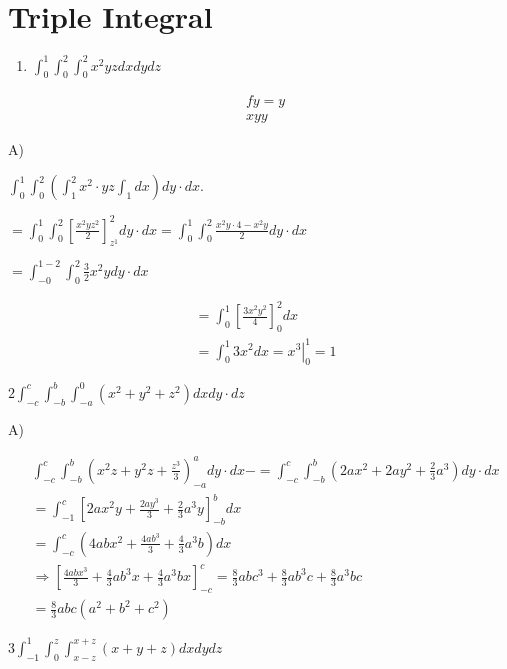 \documentclass[12pt, a4paper]{article}
\begin{document}
\section*{Triple Integral}
\begin{enumerate}
  \item $\int_{0}^{1} \int_{0}^{2} \int_{0}^{2} x^{2} y z d x d y d z$
\end{enumerate}

$$
\begin{aligned}
& f y=y \\
& x y y
\end{aligned}
$$

A)

$\int_{0}^{1} \int_{0}^{2}\left(\int_{1}^{2} x^{2} \cdot y z \int_{1} d x\right) d y \cdot d x$.

$=\int_{0}^{1} \int_{0}^{2}\left[\frac{x^{2} y z^{2}}{2}\right]_{z^{1}}^{2} d y \cdot d x=\int_{0}^{1} \int_{0}^{2} \frac{x^{2} y \cdot 4-x^{2} y}{2} d y \cdot d x$

$=\int_{-0}^{1-2} \int_{0}^{2} \frac{3}{2} x^{2} y d y \cdot d x$

$$
\begin{aligned}
& =\int_{0}^{1}\left[\frac{3 x^{2} y^{2}}{4}\right]_{0}^{2} d x \\
& =\int_{0}^{1} 3 x^{2} d x=\left.x^{3}\right|_{0} ^{1}=1
\end{aligned}
$$

$2 \int_{-c}^{c} \int_{-b}^{b} \int_{-a}^{0}\left(x^{2}+y^{2}+z^{2}\right) d x d y \cdot d z$

A)

$$
\begin{aligned}
& \int_{-c}^{c} \int_{-b}^{b}\left(x^{2} z+y^{2} z+\frac{z^{3}}{3}\right)_{-a}^{a} d y \cdot d x-=\int_{-c}^{c} \int_{-b}^{b}\left(2 a x^{2}+2 a y^{2}+\frac{2}{3} a^{3}\right) d y \cdot d x \\
&=\int_{-1}^{c}\left[2 a x^{2} y+\frac{2 a y^{3}}{3}+\frac{2}{3} a^{3} y\right]_{-b}^{b} d x \\
&=\int_{-c}^{c}\left(4 a b x^{2}+\frac{4 a b^{3}}{3}+\frac{4}{3} a^{3} b\right) d x \\
& \Rightarrow\left[\frac{4 a b x^{3}}{3}+\frac{4}{3} a b^{3} x+\frac{4}{3} a^{3} b x\right]_{-c}^{c}=\frac{8}{3} a b c^{3}+\frac{8}{3} a b^{3} c+\frac{8}{3} a^{3} b c \\
&=\frac{8}{3} a b c\left(a^{2}+b^{2}+c^{2}\right)
\end{aligned}
$$

$3 \int_{-1}^{1} \int_{0}^{z} \int_{x-z}^{x+z}(x+y+z) d x d y d z$
\end{document}
